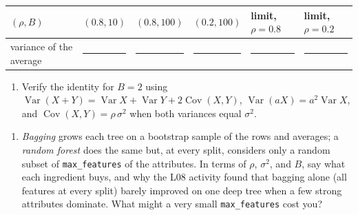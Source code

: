 \documentclass[
  11pt,
]{article}
\newcounter{none} %
\providecommand{\tightlist}{%
  \setlength{\itemsep}{0pt}\setlength{\parskip}{0pt}}
\newcommand{\answerspace}[1]{\par\vspace*{#1}}  %
\newcommand{\blank}[1][1.2in]{\rule{#1}{0.4pt}}
\newcommand{\answerpage}{\clearpage}
\begin{document}
{\def\LTcaptype{none} %
\begin{longtable}[]{@{}
  >{\raggedright\arraybackslash}p{}
  >{\raggedright\arraybackslash}p{}
  >{\raggedright\arraybackslash}p{}
  >{\raggedright\arraybackslash}p{}
  >{\raggedright\arraybackslash}p{}
  >{\raggedright\arraybackslash}p{}@{}}
\toprule\noalign{}
\begin{minipage}[b]{\linewidth}\raggedright
\((\rho, B)\)
\end{minipage} & \begin{minipage}[b]{\linewidth}\raggedright
\((0.8, 10)\)
\end{minipage} & \begin{minipage}[b]{\linewidth}\raggedright
\((0.8, 100)\)
\end{minipage} & \begin{minipage}[b]{\linewidth}\raggedright
\((0.2, 100)\)
\end{minipage} & \begin{minipage}[b]{\linewidth}\raggedright
limit, \(\rho = 0.8\)
\end{minipage} & \begin{minipage}[b]{\linewidth}\raggedright
limit, \(\rho = 0.2\)
\end{minipage} \\
\midrule\noalign{}
\endhead
\bottomrule\noalign{}
\endlastfoot
variance of the average & \blank[0.8in] & \blank[0.8in] & \blank[0.8in]
& \blank[0.8in] & \blank[0.8in] \\
\end{longtable}
}

\answerspace{1.5in}

\begin{enumerate}
\def\labelenumi{(\alph{enumi})}
\setcounter{enumi}{1}
\tightlist
\item
  Verify the identity for \(B = 2\) using
  \(\operatorname{Var}(X+Y) = \operatorname{Var}X + \operatorname{Var}Y + 2\operatorname{Cov}(X,Y)\),
  \(\operatorname{Var}(aX) = a^2\operatorname{Var}X\), and
  \(\operatorname{Cov}(X,Y) = \rho\,\sigma^2\) when both variances equal
  \(\sigma^2\).
\end{enumerate}

\answerspace{2in}
\answerpage

\begin{enumerate}
\def\labelenumi{(\alph{enumi})}
\setcounter{enumi}{2}
\tightlist
\item
  \emph{Bagging} grows each tree on a bootstrap sample of the rows and
  averages; a \emph{random forest} does the same but, at every split,
  considers only a random subset of \texttt{max\_features} of the
  attributes. In terms of \(\rho\), \(\sigma^2\), and \(B\), say what
  each ingredient buys, and why the L08 activity found that bagging
  alone (all features at every split) barely improved on one deep tree
  when a few strong attributes dominate. What might a very small
  \texttt{max\_features} cost you?
\end{enumerate}
\end{document}
